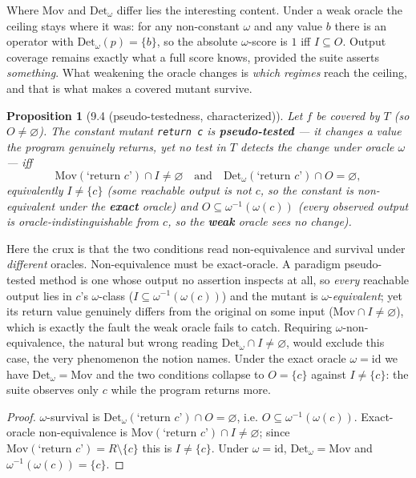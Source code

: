 \documentclass[conference]{IEEEtran}
\newcommand{\Mov}{\mathrm{Mov}}
\newcommand{\Det}{\mathrm{Det}}
\theoremstyle{run}
\newtheorem*{proposition}{Proposition}
\begin{document}
Where $\Mov$ and $\Det_\omega$ differ lies the interesting content. Under a weak oracle the ceiling stays where it was: for any non-constant $\omega$ and any value $b$ there is an operator with $\Det_\omega(p) = \{b\}$, so the absolute $\omega$-score is $1$ iff $I \subseteq O$. Output coverage remains exactly what a full score knows, provided the suite asserts \emph{something}. What weakening the oracle changes is \emph{which regimes} reach the ceiling, and that is what makes a covered mutant survive.

\begin{proposition}[9.4 (pseudo-testedness, characterized)]
Let $f$ be covered by $T$ (so $O \neq \varnothing$). The constant mutant \texttt{return c} is \textbf{pseudo-tested} --- it changes a value the program genuinely returns, yet no test in $T$ detects the change under oracle $\omega$ --- iff \[ \Mov(\text{`return }c\text{'}) \cap I \neq \varnothing \quad\text{and}\quad \Det_\omega(\text{`return }c\text{'}) \cap O = \varnothing, \] equivalently $I \neq \{c\}$ (some reachable output is not $c$, so the constant is non-equivalent under the \textbf{exact} oracle) and $O \subseteq \omega^{-1}(\omega(c))$ (every observed output is oracle-indistinguishable from $c$, so the \textbf{weak} oracle sees no change).
\end{proposition}

Here the crux is that the two conditions read non-equivalence and survival under \emph{different} oracles. Non-equivalence must be exact-oracle. A paradigm pseudo-tested method is one whose output no assertion inspects at all, so \emph{every} reachable output lies in $c$'s $\omega$-class ($I \subseteq \omega^{-1}(\omega(c))$) and the mutant is $\omega$-\emph{equivalent}; yet its return value genuinely differs from the original on some input ($\Mov \cap I \neq \varnothing$), which is exactly the fault the weak oracle fails to catch. Requiring $\omega$-non-equivalence, the natural but wrong reading $\Det_\omega \cap I \neq \varnothing$, would exclude this case, the very phenomenon the notion names. Under the exact oracle $\omega = \mathrm{id}$ we have $\Det_\omega = \Mov$ and the two conditions collapse to $O = \{c\}$ against $I \neq \{c\}$: the suite observes only $c$ while the program returns more.

\begin{proof}
$\omega$-survival is $\Det_\omega(\text{`return }c\text{'}) \cap O = \varnothing$, i.e. $O \subseteq \omega^{-1}(\omega(c))$. Exact-oracle non-equivalence is $\Mov(\text{`return }c\text{'}) \cap I \neq \varnothing$; since $\Mov(\text{`return }c\text{'}) = R \setminus \{c\}$ this is $I \neq \{c\}$. Under $\omega = \mathrm{id}$, $\Det_\omega = \Mov$ and $\omega^{-1}(\omega(c)) = \{c\}$.
\end{proof}
\end{document}
